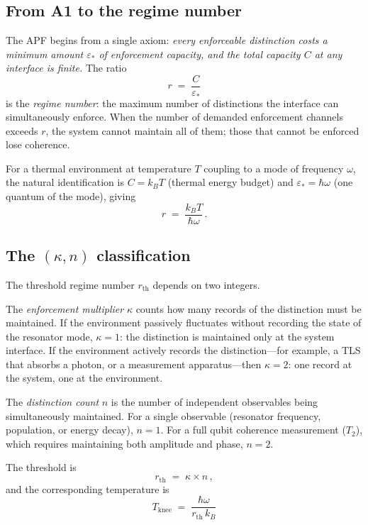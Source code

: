 \documentclass[11pt]{article}
\begin{document}
\subsection{From A1 to the regime number}

The APF begins from a single axiom: \emph{every enforceable distinction costs a minimum amount $\varepsilon_*$ of enforcement capacity, and the total capacity $C$ at any interface is finite.}  The ratio
\begin{equation}\label{eq:regime}
r \;=\; \frac{C}{\varepsilon_*}
\end{equation}
is the \emph{regime number}: the maximum number of distinctions the interface can simultaneously enforce.  When the number of demanded enforcement channels exceeds $r$, the system cannot maintain all of them; those that cannot be enforced lose coherence.

For a thermal environment at temperature $T$ coupling to a mode of frequency $\omega$, the natural identification is $C = k_B T$ (thermal energy budget) and $\varepsilon_* = \hbar\omega$ (one quantum of the mode), giving
\begin{equation}
r \;=\; \frac{k_B T}{\hbar\omega}\,.
\end{equation}

\subsection{The $(\kappa, n)$ classification}

The threshold regime number $r_{\mathrm{th}}$ depends on two integers.

The \emph{enforcement multiplier} $\kappa$ counts how many records of the distinction must be maintained.  If the environment passively fluctuates without recording the state of the resonator mode, $\kappa = 1$: the distinction is maintained only at the system interface.  If the environment actively records the distinction---for example, a TLS that absorbs a photon, or a measurement apparatus---then $\kappa = 2$: one record at the system, one at the environment.

The \emph{distinction count} $n$ is the number of independent observables being simultaneously maintained.  For a single observable (resonator frequency, population, or energy decay), $n = 1$.  For a full qubit coherence measurement ($T_2$), which requires maintaining both amplitude and phase, $n = 2$.

The threshold is
\begin{equation}\label{eq:r_th}
r_{\mathrm{th}} \;=\; \kappa \times n\,,
\end{equation}
and the corresponding temperature is
\begin{equation}\label{eq:T_knee}
\boxed{\;T_{\mathrm{knee}} \;=\; \frac{\hbar\omega}{r_{\mathrm{th}} \, k_B}\;}
\end{equation}
\end{document}
